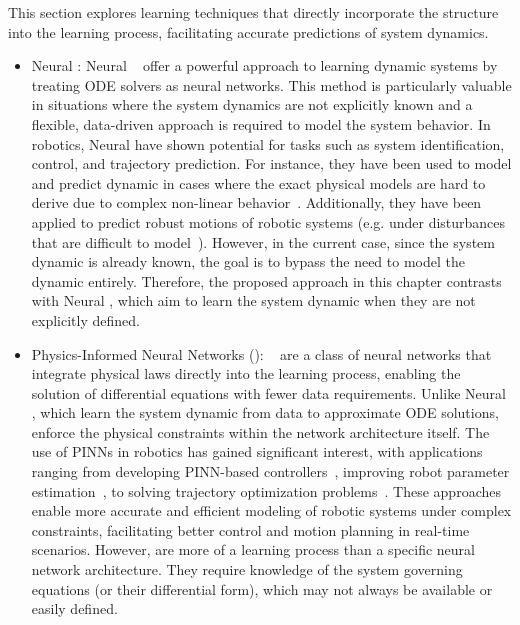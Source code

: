 This section explores learning techniques that directly incorporate the  structure into the learning process, facilitating accurate predictions of system dynamics.

\begin{itemize}
    \item Neural : Neural ~\cite{cNeuralodes} offer a powerful approach to learning dynamic systems by treating ODE solvers as neural networks. 
    This method is particularly valuable in situations where the system dynamics are not explicitly known and a flexible, data-driven approach is required to model the system behavior.
    In robotics, Neural  have shown potential for tasks such as system identification, control, and trajectory prediction. 
    For instance, they have been used to model and predict dynamic in cases where the exact physical models are hard to derive due to complex non-linear behavior~\cite{cNeuralodes}. 
    Additionally, they have been applied to predict robust motions of robotic systems (e.g. under disturbances that are difficult to model~\cite{cNODEmotion}).
    However, in the current case, since the system dynamic is already known, the goal is to bypass the need to model the dynamic entirely. 
    Therefore, the proposed approach in this chapter contrasts with Neural , which aim to learn the system dynamic when they are not explicitly defined.
    \item Physics-Informed Neural Networks (): ~\cite{cPinns} are a class of neural networks that integrate physical laws directly into the learning process, enabling the solution of differential equations with fewer data requirements. 
    Unlike Neural , which learn the system dynamic from data to approximate ODE solutions,  enforce the physical constraints within the network architecture itself. 
    The use of PINNs in robotics has gained significant interest, with applications ranging from developing PINN-based controllers~\cite{cPinnControl1, cPinnControl2}, improving robot parameter estimation~\cite{cPinnDyna}, to solving trajectory optimization problems~\cite{cPinnMotion}.
    These approaches enable more accurate and efficient modeling of robotic systems under complex constraints, facilitating better control and motion planning in real-time scenarios.
    However,  are more of a learning process than a specific neural network architecture.
    They require knowledge of the system governing equations (or their differential form), which may not always be available or easily defined.

\end{itemize}
